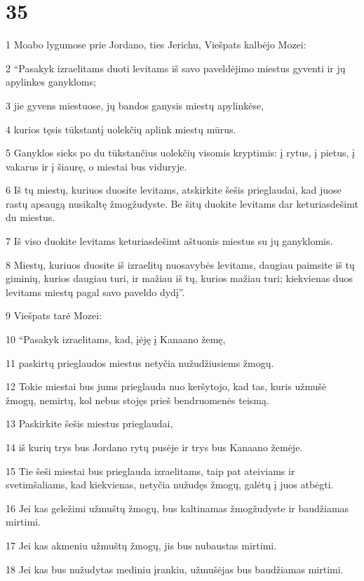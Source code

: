 \chapter{35}


\par 1 Moabo lygumose prie Jordano, ties Jerichu, Viešpats kalbėjo Mozei: 
\par 2 “Pasakyk izraelitams duoti levitams iš savo paveldėjimo miestus gyventi ir jų apylinkes ganykloms; 
\par 3 jie gyvens miestuose, jų bandos ganysis miestų apylinkėse, 
\par 4 kurios tęsis tūkstantį uolekčių aplink miestų mūrus. 
\par 5 Ganyklos sieks po du tūkstančius uolekčių visomis kryptimis: į rytus, į pietus, į vakarus ir į šiaurę, o miestai bus viduryje. 
\par 6 Iš tų miestų, kuriuos duosite levitams, atskirkite šešis prieglaudai, kad juose rastų apsaugą nusikaltę žmogžudyste. Be šitų duokite levitams dar keturiasdešimt du miestus. 
\par 7 Iš viso duokite levitams keturiasdešimt aštuonis miestus su jų ganyklomis. 
\par 8 Miestų, kuriuos duosite iš izraelitų nuosavybės levitams, daugiau paimsite iš tų giminių, kurios daugiau turi, ir mažiau iš tų, kurios mažiau turi; kiekvienas duos levitams miestų pagal savo paveldo dydį”. 
\par 9 Viešpats tarė Mozei: 
\par 10 “Pasakyk izraelitams, kad, įėję į Kanaano žemę, 
\par 11 paskirtų prieglaudos miestus netyčia nužudžiusiems žmogų. 
\par 12 Tokie miestai bus jums prieglauda nuo keršytojo, kad tas, kuris užmušė žmogų, nemirtų, kol nebus stojęs prieš bendruomenės teismą. 
\par 13 Paskirkite šešis miestus prieglaudai, 
\par 14 iš kurių trys bus Jordano rytų pusėje ir trys bus Kanaano žemėje. 
\par 15 Tie šeši miestai bus prieglauda izraelitams, taip pat ateiviams ir svetimšaliams, kad kiekvienas, netyčia nužudęs žmogų, galėtų į juos atbėgti. 
\par 16 Jei kas geležimi užmuštų žmogų, bus kaltinamas žmogžudyste ir baudžiamas mirtimi. 
\par 17 Jei kas akmeniu užmuštų žmogų, jis bus nubaustas mirtimi. 
\par 18 Jei kas bus nužudytas mediniu įrankiu, užmušėjas bus baudžiamas mirtimi. 
